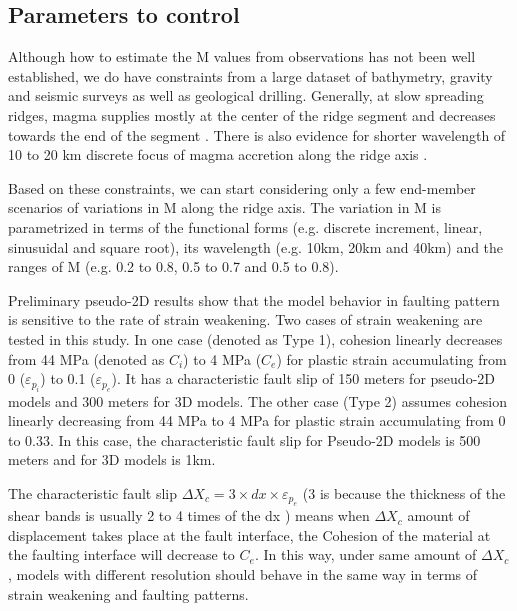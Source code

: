 \subsection{Parameters to control}
Although how to estimate the M values from observations has not been well established, we do have constraints from a large dataset of bathymetry, gravity and seismic surveys as well as geological drilling. Generally, at slow spreading ridges, magma supplies mostly at the center of the ridge segment and decreases towards the end of the segment \citep{Tolstoy1993,Chen1999}. There is also evidence for shorter wavelength of 10 to 20 km discrete focus of magma accretion along the ridge axis \citep{Lin1990}. 

Based on these constraints, we can start considering only a few end-member scenarios of variations in M along the ridge axis. The variation in M is parametrized in terms of the functional forms (e.g. discrete increment, linear, sinusuidal and square root), its wavelength (e.g. 10km, 20km and 40km) and the ranges of M (e.g. 0.2 to 0.8, 0.5 to 0.7 and 0.5 to 0.8). 

Preliminary pseudo-2D results show that the model behavior in faulting pattern is sensitive to the rate of strain weakening. Two cases of strain weakening are tested in this study. In one case (denoted as Type 1), cohesion linearly decreases from 44 MPa (denoted as $C_{i}$) to 4 MPa ($C_{e}$) for plastic strain accumulating from 0 ($\varepsilon_{p_{i}}$) to 0.1 ($\varepsilon_{p_{e}}$). It has a characteristic fault slip of 150 meters for pseudo-2D models and 300 meters for 3D models. The other case (Type 2) assumes cohesion linearly decreasing from 44 MPa to 4 MPa for plastic strain accumulating from 0 to 0.33. In this case, the characteristic fault slip for Pseudo-2D models is 500 meters and for 3D models is 1km.

The characteristic fault slip $\Delta X_{c}=3 \times dx \times \varepsilon_{p_{e}}$ (3 is because the thickness of the shear bands is usually 2 to 4 times of the dx \citep{Lavier2000}) means when $\Delta X_{c}$ amount of displacement takes place at the fault interface, the Cohesion of the material at the faulting interface will decrease to $C_{e}$. In this way, under same amount of $\Delta X_{c}$, models with different resolution should behave in the same way in terms of strain weakening and faulting patterns. 

